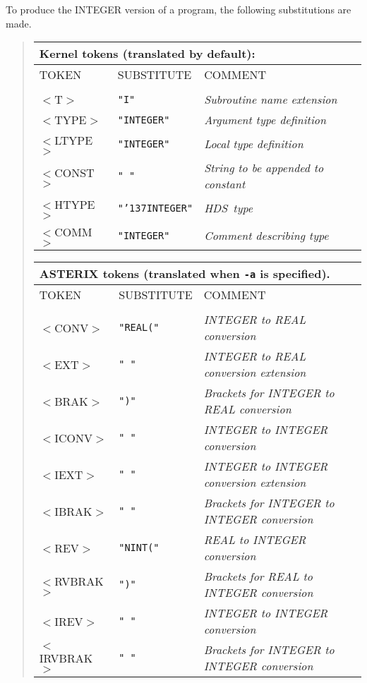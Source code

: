 \documentclass[twoside,11pt]{article}
\renewcommand{\_}{{\tt\char'137}}     %
\newcommand{\HDS}{{\footnotesize HDS}\normalsize}
\begin{document}
To produce the INTEGER version of a program, the following substitutions
are made.
\begin{quote}
\begin{tabular}{lll}
\multicolumn{3}{l}{\bf{Kernel} tokens (translated by default):}\\
\hline
TOKEN  &SUBSTITUTE   &COMMENT\\
\\
$<$T$>$     &{\tt "I"}         &{\em Subroutine name extension}\\
$<$TYPE$>$  &{\tt "INTEGER"}   &{\em Argument type definition}\\
$<$LTYPE$>$ &{\tt "INTEGER"}   &{\em Local type definition}\\
$<$CONST$>$ &{\tt " "}         &{\em String to be appended to constant}\\
$<$HTYPE$>$ &{\tt "\_INTEGER"} &{\em \HDS\ type}\\
$<$COMM$>$  &{\tt "INTEGER"}   &{\em Comment describing type}\\
\end{tabular}

\begin{tabular}{lll}
\multicolumn{3}{l}{\bf{ASTERIX} tokens (translated when {\tt -a} is specified).}\\
\hline
TOKEN  &SUBSTITUTE   &COMMENT\\
\\
$<$CONV$>$     &{\tt "REAL("} &{\em INTEGER to REAL conversion}\\
$<$EXT$>$      &{\tt " "}   &{\em INTEGER to REAL conversion extension}\\
$<$BRAK$>$     &{\tt ")"}     &{\em Brackets for INTEGER to REAL conversion}\\
$<$ICONV$>$    &{\tt " "}     &{\em INTEGER to INTEGER conversion}\\
$<$IEXT$>$     &{\tt " "}     &{\em INTEGER to INTEGER conversion extension}\\
$<$IBRAK$>$    &{\tt " "}     &{\em Brackets for INTEGER to INTEGER conversion}\\
$<$REV$>$      &{\tt "NINT("} &{\em REAL to INTEGER conversion}\\
$<$RVBRAK$>$   &{\tt ")"}     &{\em Brackets for REAL to INTEGER conversion}\\
$<$IREV$>$     &{\tt " "}     &{\em INTEGER to INTEGER conversion}\\
$<$IRVBRAK$>$  &{\tt " "}     &{\em Brackets for INTEGER to INTEGER
conversion}\\
\end{tabular}
\end{quote}
\end{document}
